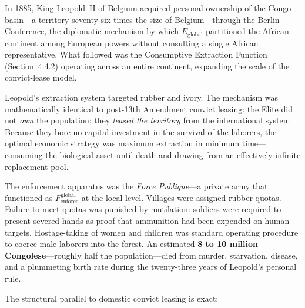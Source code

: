 In 1885, King Leopold~II of Belgium acquired personal ownership of the Congo basin---a territory seventy-six times the size of Belgium---through the Berlin Conference, the diplomatic mechanism by which $E_{\text{global}}$ partitioned the African continent among European powers without consulting a single African representative. What followed was the Consumptive Extraction Function (Section~4.4.2) operating across an entire continent, expanding the scale of the convict-lease model.

Leopold's extraction system targeted rubber and ivory. The mechanism was mathematically identical to post-13th Amendment convict leasing: the Elite did not \textit{own} the population; they \textit{leased the territory} from the international system. Because they bore no capital investment in the survival of the laborers, the optimal economic strategy was maximum extraction in minimum time---consuming the biological asset until death and drawing from an effectively infinite replacement pool.

The enforcement apparatus was the \textit{Force Publique}---a private army that functioned as $F_{\text{enforce}}^{\text{global}}$ at the local level. Villages were assigned rubber quotas. Failure to meet quotas was punished by mutilation: soldiers were required to present severed hands as proof that ammunition had been expended on human targets. Hostage-taking of women and children was standard operating procedure to coerce male laborers into the forest. An estimated \textbf{8 to 10 million Congolese}---roughly half the population---died from murder, starvation, disease, and a plummeting birth rate during the twenty-three years of Leopold's personal rule.

The structural parallel to domestic convict leasing is exact:

